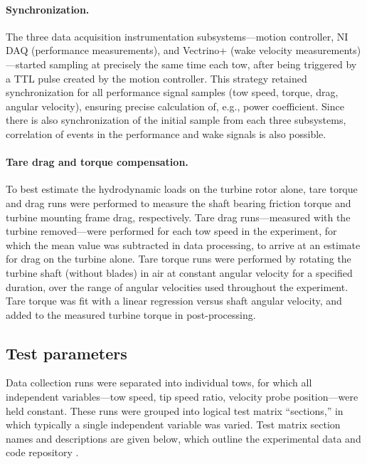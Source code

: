 \documentclass[10pt,letterpaper]{article}
\begin{document}
\paragraph{Synchronization.} The three data acquisition instrumentation
subsystems---motion controller, NI DAQ (performance measurements), and Vectrino+
(wake velocity measurements)---started sampling at precisely the same time each
tow, after being triggered by a TTL pulse created by the motion controller. This
strategy retained synchronization for all performance signal samples (tow speed,
torque, drag, angular velocity), ensuring precise calculation of, e.g., power
coefficient. Since there is also synchronization of the initial sample from each
three subsystems, correlation of events in the performance and wake signals is
also possible.

\paragraph{Tare drag and torque compensation.} To best estimate the hydrodynamic
loads on the turbine rotor alone, tare torque and drag runs were performed to
measure the shaft bearing friction torque and turbine mounting frame drag,
respectively. Tare drag runs---measured with the turbine removed---were
performed for each tow speed in the experiment, for which the mean value was
subtracted in data processing, to arrive at an estimate for drag on the turbine
alone. Tare torque runs were performed by rotating the turbine shaft (without
blades) in air at constant angular velocity for a specified duration, over the
range of angular velocities used throughout the experiment. Tare torque was fit
with a linear regression versus shaft angular velocity, and added to the
measured turbine torque in post-processing.


\subsection*{Test parameters}

Data collection runs were separated into individual tows, for which all
independent variables---tow speed, tip speed ratio, velocity probe
position---were held constant. These runs were grouped into logical test matrix
``sections,'' in which typically a single independent variable was varied. Test
matrix section names and descriptions are given below, which outline the
experimental data and code repository \cite{Bachant2015-RM2-data}.
\end{document}
